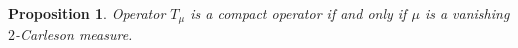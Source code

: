 \documentclass[10pt,leqno]{amsart}
\newtheorem{proposition}[theorem]{Proposition}
\theoremstyle{remark}
\numberwithin{equation}{section}
\begin{document}



\begin{proposition}
	Operator $T_\mu$ is a compact operator if and only if $\mu$ is a vanishing $2$-Carleson measure.
\end{proposition}
\end{document}

